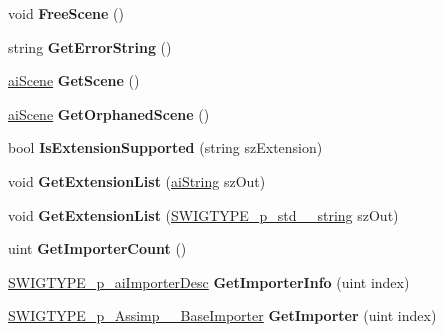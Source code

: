 \begin{DoxyCompactItemize}
\item 
\hypertarget{class_importer_a4dea44def17629f2fcef577cd6165fd1}{void {\bfseries Free\+Scene} ()}\label{class_importer_a4dea44def17629f2fcef577cd6165fd1}

\item 
\hypertarget{class_importer_a7102b92451e414e530d94f325778e3f9}{string {\bfseries Get\+Error\+String} ()}\label{class_importer_a7102b92451e414e530d94f325778e3f9}

\item 
\hypertarget{class_importer_acdfb7471871771852aa5b74e273fb05b}{\hyperlink{structai_scene}{ai\+Scene} {\bfseries Get\+Scene} ()}\label{class_importer_acdfb7471871771852aa5b74e273fb05b}

\item 
\hypertarget{class_importer_ada8160c471fda58145f8f6939d64f433}{\hyperlink{structai_scene}{ai\+Scene} {\bfseries Get\+Orphaned\+Scene} ()}\label{class_importer_ada8160c471fda58145f8f6939d64f433}

\item 
\hypertarget{class_importer_afaecee0b958c9eab9530b58e35235e1d}{bool {\bfseries Is\+Extension\+Supported} (string sz\+Extension)}\label{class_importer_afaecee0b958c9eab9530b58e35235e1d}

\item 
\hypertarget{class_importer_acd1edd90561d1846f2d65265c3914a3a}{void {\bfseries Get\+Extension\+List} (\hyperlink{structai_string}{ai\+String} sz\+Out)}\label{class_importer_acd1edd90561d1846f2d65265c3914a3a}

\item 
\hypertarget{class_importer_a294890ed71fa23e3d97f4055f02ee45c}{void {\bfseries Get\+Extension\+List} (\hyperlink{class_s_w_i_g_t_y_p_e__p__std____string}{S\+W\+I\+G\+T\+Y\+P\+E\+\_\+p\+\_\+std\+\_\+\+\_\+string} sz\+Out)}\label{class_importer_a294890ed71fa23e3d97f4055f02ee45c}

\item 
\hypertarget{class_importer_a0dfd8717516323e046fb999d3b381615}{uint {\bfseries Get\+Importer\+Count} ()}\label{class_importer_a0dfd8717516323e046fb999d3b381615}

\item 
\hypertarget{class_importer_a52505eabfac51ab9818d2aceb82eecaf}{\hyperlink{class_s_w_i_g_t_y_p_e__p__ai_importer_desc}{S\+W\+I\+G\+T\+Y\+P\+E\+\_\+p\+\_\+ai\+Importer\+Desc} {\bfseries Get\+Importer\+Info} (uint index)}\label{class_importer_a52505eabfac51ab9818d2aceb82eecaf}

\item 
\hypertarget{class_importer_abd145113a7e3dab07f5458f340cbfd3d}{\hyperlink{class_s_w_i_g_t_y_p_e__p___assimp_____base_importer}{S\+W\+I\+G\+T\+Y\+P\+E\+\_\+p\+\_\+\+Assimp\+\_\+\+\_\+\+Base\+Importer} {\bfseries Get\+Importer} (uint index)}\label{class_importer_abd145113a7e3dab07f5458f340cbfd3d}


\end{DoxyCompactItemize}
